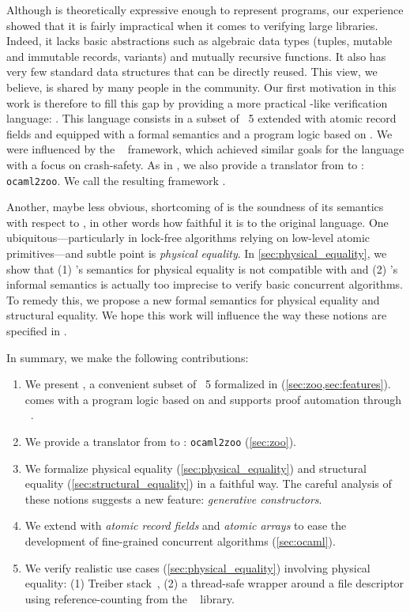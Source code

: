 Although \HeapLang is theoretically expressive enough to represent \OCaml programs, our experience showed that it is fairly impractical when it comes to verifying large \OCaml libraries.
Indeed, it lacks basic abstractions such as algebraic data types (tuples, mutable and immutable records, variants) and mutually recursive functions.
It also has very few standard data structures that can be directly reused.
This view, we believe, is shared by many people in the \Iris community.
Our first motivation in this work is therefore to fill this gap by providing a more practical \OCaml-like verification language: \ZooLang.
This language consists in a subset of \OCaml~5 extended with atomic record fields and equipped with a formal semantics and a program logic based on \Iris.
We were influenced by the \Perennial~\cite{DBLP:conf/sosp/ChajedTKZ19,DBLP:conf/osdi/ChajedTT0KZ21,DBLP:conf/osdi/ChajedTTKZ22,DBLP:conf/osdi/Chang0STKZ23} framework, which achieved similar goals for the \Go language with a focus on crash-safety.
As in \Perennial, we also provide a translator from \OCaml to \ZooLang: \texttt{ocaml2zoo}.
We call the resulting framework \Zoo.

Another, maybe less obvious, shortcoming of \HeapLang is the soundness of its semantics with respect to \OCaml, in other words how faithful it is to the original language.
One ubiquitous---particularly in lock-free algorithms relying on low-level atomic primitives---and subtle point is \emph{physical equality}.
In \cref{sec:physical_equality}, we show that (1) \HeapLang's semantics for physical equality is not compatible with \OCaml and (2) \OCaml's informal semantics is actually too imprecise to verify basic concurrent algorithms.
To remedy this, we propose a new formal semantics for physical equality and structural equality.
We hope this work will influence the way these notions are specified in \OCaml.

In summary, we make the following contributions:
\begin{enumerate}
  \item
    We present \ZooLang, a convenient subset of \OCaml~5 formalized in \Rocq (\cref{sec:zoo,sec:features}).
    \ZooLang comes with a program logic based on \Iris and supports proof automation through \Diaframe~\cite{DBLP:conf/pldi/MulderKG22,DBLP:journals/pacmpl/MulderK23}.
  \item
    We provide a translator from \OCaml to \ZooLang: \texttt{ocaml2zoo} (\cref{sec:zoo}).
  \item
    We formalize physical equality (\cref{sec:physical_equality}) and structural equality (\cref{sec:structural_equality}) in a faithful way.
    The careful analysis of these notions suggests a new \OCaml feature: \emph{generative constructors}.
  \item
    We extend \OCaml with \emph{atomic record fields} and \emph{atomic arrays} to ease the development of fine-grained concurrent algorithms (\cref{sec:ocaml}).
  \item
    We verify realistic use cases (\cref{sec:physical_equality}) involving physical equality: (1) Treiber stack~\cite{thomas1986systems}, (2) a thread-safe wrapper around a file descriptor using reference-counting from the \Eio~\cite{eio} library.
\end{enumerate}
